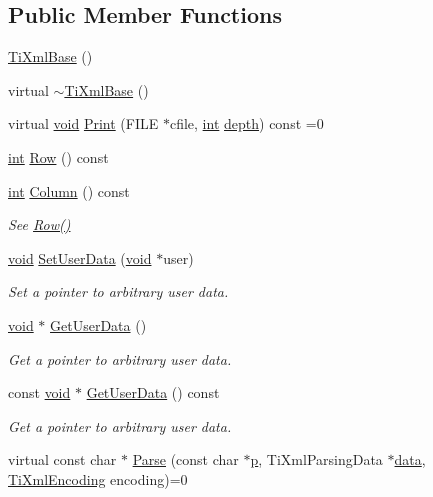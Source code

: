 \subsection*{Public Member Functions}
\begin{DoxyCompactItemize}
\item 
\hyperlink{class_ti_xml_base_ac6753fe8a2c89669038fcf281cb301bf}{Ti\-Xml\-Base} ()
\item 
virtual \hyperlink{class_ti_xml_base_ad1837ecb25a913612fa1115f090cbb56}{$\sim$\-Ti\-Xml\-Base} ()
\item 
virtual \hyperlink{wglew_8h_aeea6e3dfae3acf232096f57d2d57f084}{void} \hyperlink{class_ti_xml_base_a0de56b3f2ef14c65091a3b916437b512}{Print} (F\-I\-L\-E $\ast$cfile, \hyperlink{wglew_8h_a500a82aecba06f4550f6849b8099ca21}{int} \hyperlink{glew_8h_a1c814629538debe12a7bfe2509a3671e}{depth}) const =0
\item 
\hyperlink{wglew_8h_a500a82aecba06f4550f6849b8099ca21}{int} \hyperlink{class_ti_xml_base_a024bceb070188df92c2a8d8852dd0853}{Row} () const 
\item 
\hyperlink{wglew_8h_a500a82aecba06f4550f6849b8099ca21}{int} \hyperlink{class_ti_xml_base_ab54bfb9b70fe6dd276e7b279cab7f003}{Column} () const 
\begin{DoxyCompactList}\small\item\em See \hyperlink{class_ti_xml_base_a024bceb070188df92c2a8d8852dd0853}{Row()} \end{DoxyCompactList}\item 
\hyperlink{wglew_8h_aeea6e3dfae3acf232096f57d2d57f084}{void} \hyperlink{class_ti_xml_base_ac6b3e0f790930d4970ec30764e937b5d}{Set\-User\-Data} (\hyperlink{wglew_8h_aeea6e3dfae3acf232096f57d2d57f084}{void} $\ast$user)
\begin{DoxyCompactList}\small\item\em Set a pointer to arbitrary user data. \end{DoxyCompactList}\item 
\hyperlink{wglew_8h_aeea6e3dfae3acf232096f57d2d57f084}{void} $\ast$ \hyperlink{class_ti_xml_base_a6559a530ca6763fc301a14d77ed28c17}{Get\-User\-Data} ()
\begin{DoxyCompactList}\small\item\em Get a pointer to arbitrary user data. \end{DoxyCompactList}\item 
const \hyperlink{wglew_8h_aeea6e3dfae3acf232096f57d2d57f084}{void} $\ast$ \hyperlink{class_ti_xml_base_ad0120210e4680ef2088601753ce0ede4}{Get\-User\-Data} () const 
\begin{DoxyCompactList}\small\item\em Get a pointer to arbitrary user data. \end{DoxyCompactList}\item 
virtual const char $\ast$ \hyperlink{class_ti_xml_base_a00e4edb0219d00a1379c856e5a1d2025}{Parse} (const char $\ast$\hyperlink{glew_8h_aa5367c14d90f462230c2611b81b41d23}{p}, Ti\-Xml\-Parsing\-Data $\ast$\hyperlink{fmod__codec_8h_a42c2b1d86fa71a425e73a882cb0a72c8}{data}, \hyperlink{tinyxml_8h_a88d51847a13ee0f4b4d320d03d2c4d96}{Ti\-Xml\-Encoding} encoding)=0
\end{DoxyCompactItemize}
